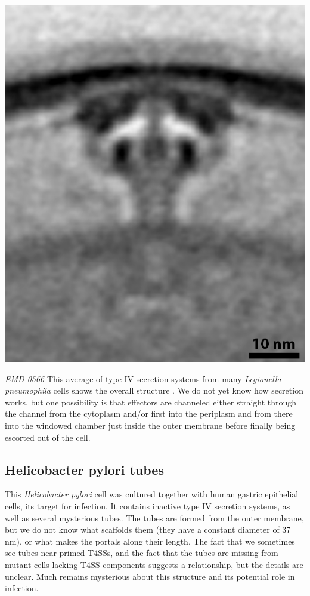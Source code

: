 \documentclass[]{tufte-book}
\begin{document}
\includegraphics{img/schematics/9_3_2}

\emph{EMD-0566} This average of type IV secretion systems from many
\emph{Legionella pneumophila} cells shows the overall structure
\citep{ghosal2019a}. We do not yet know how secretion works, but one
possibility is that effectors are channeled either straight through the
channel from the cytoplasm and/or first into the periplasm and from
there into the windowed chamber just inside the outer membrane before
finally being escorted out of the cell.

\hypertarget{Helicobacter_pylori_tubes}{\subsection{Helicobacter pylori
tubes}\label{Helicobacter_pylori_tubes}}

This \emph{Helicobacter pylori} cell was cultured together with human
gastric epithelial cells, its target for infection. It contains inactive
type IV secretion systems, as well as several mysterious tubes. The
tubes are formed from the outer membrane, but we do not know what
scaffolds them (they have a constant diameter of 37 nm), or what makes
the portals along their length. The fact that we sometimes see tubes
near primed T4SSs, and the fact that the tubes are missing from mutant
cells lacking T4SS components suggests a relationship, but the details
are unclear. Much remains mysterious about this structure and its
potential role in infection.
\end{document}
